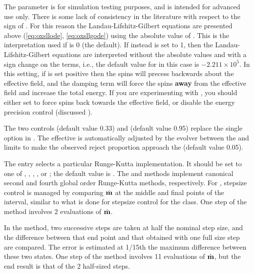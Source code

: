 \begin{description}
The  parameter is for simulation testing
purposes, and is intended for advanced use only.  There is some lack of
consistency in the literature with respect to the sign of
\abovemath{\gamma}.  For this reason the Landau-Lifshitz-Gilbert
equations are presented above (\ref{eq:oxsllode}, \ref{eq:oxsllgode})
using the absolute value of \abovemath{\gamma}.  This is the
interpretation used if  is 0 (the default).  If
instead  is set to 1, then the
Landau-Lifshitz-Gilbert equations are interpreted without the absolute
values and with a sign change on the \abovemath{\gamma} terms, i.e., the
default value for \abovemath{\gamma} in this case is $-2.211 \times
10^5$.  In this setting, if \abovemath{\gamma} is set positive then the
spins will precess backwards about the effective field, and the damping
term will force the spins \textbf{away} from the effective field and
increase the total energy.  If you are experimenting with
, you should either set  to
force spins back towards the effective field, or disable the energy
precision control (discussed ).

The two controls  (default value 0.33) and
 (default value 0.95) replace the single
 option in .  The effective
 is automatically adjusted by the evolver between the
 and  limits to make the
observed reject proportion approach the  (default
value 0.05).

The  entry selects a particular Runge-Kutta
implementation.  It should be set to one of ,
, , , or ;
the default value is .  The  and
 methods implement canonical second and fourth global order
Runge-Kutta methods\cite{stoer93}, respectively.  For ,
stepsize control is managed by comparing $\dot{\textbf{m}}$ at the middle and
final points of the interval, similar to what is done for stepsize
control for the  class.  One step of the
 method involves 2 evaluations of $\dot{\textbf{m}}$.

In the  method, two successive steps are taken at half the
nominal step size, and the difference between that end point and that
obtained with one full size step are compared.  The error is estimated at
1/15th the maximum difference between these two states.  One step of the
 method involves 11 evaluations of $\dot{\textbf{m}}$, but the
end result is that of the 2 half-sized steps.


\end{description}
